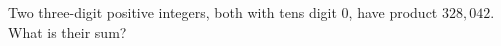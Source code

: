 Two three-digit positive integers, both with tens digit $0$, have product $328{,}042$. What is their sum?
